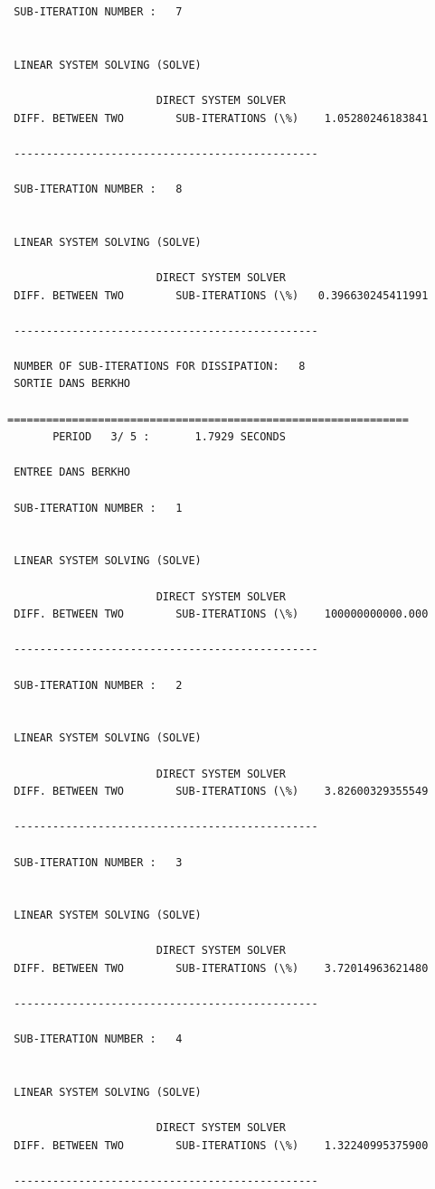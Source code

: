 \begin{verbatim}
 SUB-ITERATION NUMBER :   7


 LINEAR SYSTEM SOLVING (SOLVE)

                       DIRECT SYSTEM SOLVER
 DIFF. BETWEEN TWO        SUB-ITERATIONS (\%)    1.05280246183841

 -----------------------------------------------

 SUB-ITERATION NUMBER :   8


 LINEAR SYSTEM SOLVING (SOLVE)

                       DIRECT SYSTEM SOLVER
 DIFF. BETWEEN TWO        SUB-ITERATIONS (\%)   0.396630245411991

 -----------------------------------------------

 NUMBER OF SUB-ITERATIONS FOR DISSIPATION:   8
 SORTIE DANS BERKHO

==============================================================
       PERIOD   3/ 5 :       1.7929 SECONDS

 ENTREE DANS BERKHO

 SUB-ITERATION NUMBER :   1


 LINEAR SYSTEM SOLVING (SOLVE)

                       DIRECT SYSTEM SOLVER
 DIFF. BETWEEN TWO        SUB-ITERATIONS (\%)    100000000000.000

 -----------------------------------------------

 SUB-ITERATION NUMBER :   2


 LINEAR SYSTEM SOLVING (SOLVE)

                       DIRECT SYSTEM SOLVER
 DIFF. BETWEEN TWO        SUB-ITERATIONS (\%)    3.82600329355549

 -----------------------------------------------

 SUB-ITERATION NUMBER :   3


 LINEAR SYSTEM SOLVING (SOLVE)

                       DIRECT SYSTEM SOLVER
 DIFF. BETWEEN TWO        SUB-ITERATIONS (\%)    3.72014963621480

 -----------------------------------------------

 SUB-ITERATION NUMBER :   4


 LINEAR SYSTEM SOLVING (SOLVE)

                       DIRECT SYSTEM SOLVER
 DIFF. BETWEEN TWO        SUB-ITERATIONS (\%)    1.32240995375900

 -----------------------------------------------


\end{verbatim}
